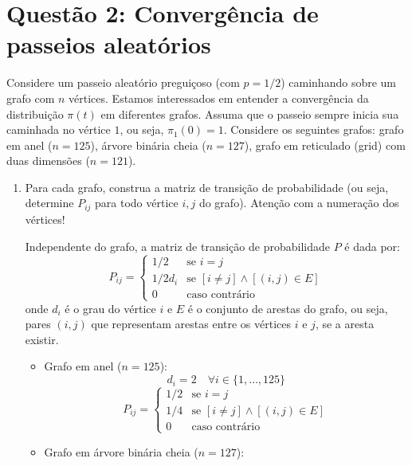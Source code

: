 \section*{Questão 2: Convergência de passeios aleatórios}
Considere um passeio aleatório preguiçoso (com $p = 1/2$) caminhando sobre um grafo com $n$ vértices. Estamos interessados em entender a convergência da distribuição $\pi(t)$ em diferentes grafos. Assuma que o passeio sempre inicia sua caminhada no vértice $1$, ou seja, $\pi_1(0) = 1$. Considere os seguintes grafos: grafo em anel ($n = 125$), árvore binária cheia ($n = 127$), grafo em reticulado (grid) com duas dimensões ($n = 121$).

\begin{enumerate}
    \item Para cada grafo, construa a matriz de transição de probabilidade (ou seja, determine $P_{ij}$ para todo vértice $i, j$ do grafo). Atenção com a numeração dos vértices!
    \begin{resposta}
        Independente do grafo, a matriz de transição de probabilidade $P$ é dada por:
        $$
            P_{ij} = \begin{cases}
                1/2 & \text{se } i = j \\
                1/2d_i & \text{se } [i \neq j] \land [(i,j) \in E] \\
                0 & \text{caso contrário}
            \end{cases}
        $$
        onde $d_i$ é o grau do vértice $i$ e $E$ é o conjunto de arestas do grafo, ou seja, pares $(i,j)$ que representam arestas entre os vértices $i$ e $j$, se a aresta existir.

        \begin{itemize}
            \item Grafo em anel ($n = 125$):
            $$d_i = 2 \quad \forall i \in \{1, \dots, 125\}$$
            $$
            P_{ij} = \begin{cases}
                1/2 & \text{se } i = j \\
                1/4 & \text{se } [i \neq j] \land [(i,j) \in E] \\
                0 & \text{caso contrário}
            \end{cases}
            $$
            \item Grafo em árvore binária cheia ($n = 127$):
            

\end{itemize}
\end{resposta}
\end{enumerate}
